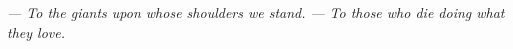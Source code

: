 %
%

\pubmode
	\onecolumngrid
\fi

\vspace*{180px}
\begin{center}
\pubmode
	\textit{--- To the giants upon whose shoulders we stand.}
\else
	\textit{--- To those who die doing what they love.}
\fi
\end{center}
\newpage

\pubmode
	\twocolumngrid
\fi
